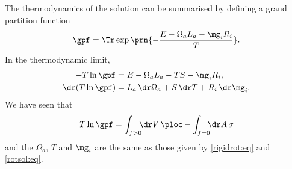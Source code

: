 The thermodynamics of the solution can be summarised by defining a grand partition function
%
\begin{equation}\label{gpf:eq}
  \gpf = \Tr\exp\prn{-\frac{E -\Omega_a L_a  - \mg_i R_i}{T}}.
\end{equation}
%
In the thermodynamic limit,
%
\begin{equation}\label{gpftherm:eq}
  \begin{split}
    -T\ln\gpf &= E -\Omega_a L_a - T S - \mg_i R_i, \\
    \dr(T\ln\gpf) &= L_a \,\dr \Omega_a + S \,\dr T + R_i \,\dr \mg_i.
  \end{split}
\end{equation}
%
We have seen that
%
\begin{equation}\label{gpfrot:eq}
  T\ln\gpf = \int_{f>0}\!\!\!\dr V \,\ploc - \int_{f=0}\!\!\!\dr A \,\sigma
\end{equation}
%
and the $\Omega_a$, $T$ and $\mg_i$ are the same as those given by \eqref{rigidrot:eq} and \eqref{rotsol:eq}.






